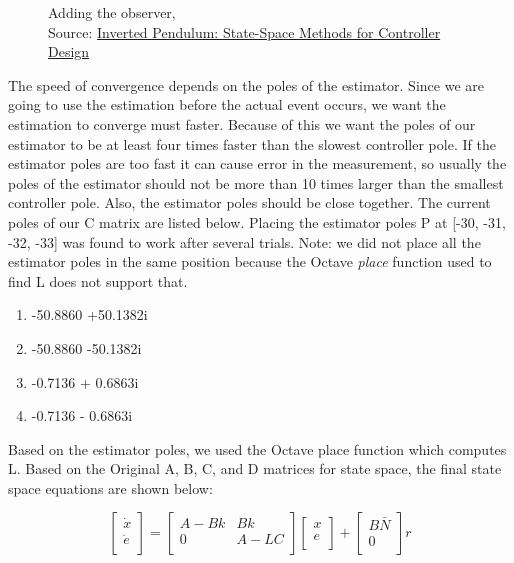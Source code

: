 \documentclass{article}
\begin{document}
\begin{figure}
\begin{minipage}[c]{0.45\textwidth}
{{	\label{fig:bd2}
}}
\end{minipage}
\caption{Adding the observer, \\ Source: \href{http://ctms.engin.umich.edu/CTMS/index.php?example=InvertedPendulum&section=ControlStateSpace}{Inverted Pendulum: State-Space Methods for Controller Design}}
\end{figure}

The speed of convergence depends on the poles of the estimator. Since we are going to use the estimation before the actual event occurs, we want the estimation to converge must faster. Because of this we want the poles of our estimator to be at least four times faster than the slowest controller pole. If the estimator poles are too fast it can cause error in the measurement, so usually the poles of the estimator should not be more than 10 times larger than the smallest controller pole. Also, the estimator poles should be close together. The current poles of our C matrix are listed below. Placing the estimator poles P at [-30, -31, -32, -33] was found to work after several trials. Note: we did not place all the estimator poles in the same position because the Octave \textit{place} function used to find L does not support that.
\begin{enumerate}
  \item  -50.8860 +50.1382i
  \item -50.8860 -50.1382i
  \item -0.7136 + 0.6863i
  \item -0.7136 - 0.6863i
\end{enumerate}

Based on the estimator poles, we used the Octave place function which computes L. Based on the Original A, B, C, and D matrices for state space, the final state space equations are shown below:

\begin{equation}
\label{ss3}
\begin{bmatrix}
\dot{x}\\
\dot{e}\\
\end{bmatrix}
=
\begin{bmatrix}
A-Bk&Bk\\
0&A-LC\\
\end{bmatrix}
\begin{bmatrix}
x\\
e\\
\end{bmatrix} +
\begin{bmatrix}
B\bar{N}\\
0\\
\end{bmatrix} r
\end{equation}
\end{document}
